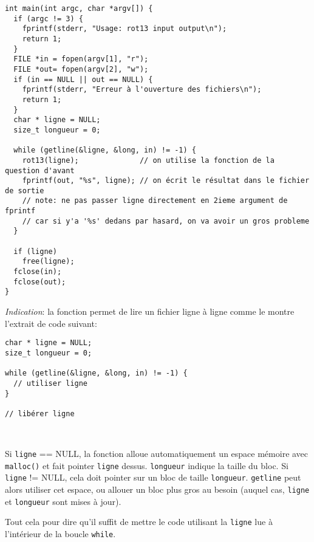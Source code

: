 \documentclass[10pt]{article}
\begin{document}
\begin{Exercice}
\begin{Reponse}
  \begin{Verbatim}
int main(int argc, char *argv[]) {
  if (argc != 3) {
    fprintf(stderr, "Usage: rot13 input output\n");
    return 1;
  }
  FILE *in = fopen(argv[1], "r");
  FILE *out= fopen(argv[2], "w");
  if (in == NULL || out == NULL) {
    fprintf(stderr, "Erreur à l'ouverture des fichiers\n");
    return 1;
  }
  char * ligne = NULL;
  size_t longueur = 0;

  while (getline(&ligne, &long, in) != -1) {
    rot13(ligne);              // on utilise la fonction de la question d'avant
    fprintf(out, "%s", ligne); // on écrit le résultat dans le fichier de sortie
    // note: ne pas passer ligne directement en 2ieme argument de fprintf 
    // car si y'a '%s' dedans par hasard, on va avoir un gros probleme
  }

  if (ligne)
    free(ligne);
  fclose(in);
  fclose(out);
}    
  \end{Verbatim}
\end{Reponse}

\medskip\noindent \textit{Indication}: la fonction  permet de lire un fichier
ligne à ligne comme le montre l'extrait de code suivant:

\noindent\begin{minipage}{.5\linewidth}
\begin{Verbatim}
char * ligne = NULL;
size_t longueur = 0;

while (getline(&ligne, &long, in) != -1) {
  // utiliser ligne
}

// libérer ligne
\end{Verbatim}
  
\end{minipage}~~\begin{minipage}{.5\linewidth}
Si \texttt{ligne} == NULL, la fonction alloue automatiquement un espace
mémoire avec \texttt{malloc()} et fait pointer \texttt{ligne}
dessus. \texttt{longueur} indique la taille du bloc. Si
\texttt{ligne} != NULL, cela doit pointer sur un bloc de
taille \texttt{longueur}. \texttt{getline} peut alors utiliser cet espace, ou
allouer un bloc plus gros au besoin (auquel cas, \texttt{ligne} et
\texttt{longueur} sont mises à jour).
\end{minipage}

\smallskip Tout cela pour dire qu'il suffit de mettre le code utilisant la
\texttt{ligne} lue à l'intérieur de la boucle \texttt{while}.
\end{Exercice}
\end{document}

